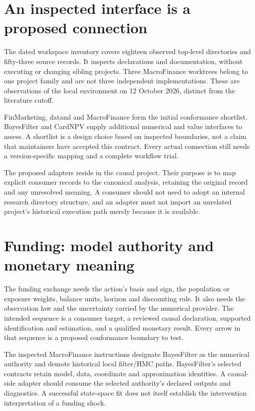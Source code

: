 \section{An inspected interface is a proposed connection}

The dated workspace inventory covers eighteen observed top-level directories
and fifty-three source records. It inspects declarations and documentation,
without executing or changing sibling projects. Three MacroFinance worktrees
belong to one project family and are not three independent implementations.
These are observations of the local environment on 12 October 2026, distinct
from the literature cutoff.\cite{v12_in_inventory}

FinMarketing, dataml and MacroFinance form the initial conformance shortlist.
BayesFilter and CardNPV supply additional numerical and value interfaces to
assess. A shortlist is a design choice based on inspected boundaries, not a
claim that maintainers have accepted this contract. Every actual connection
still needs a version-specific mapping and a complete workflow trial.

The proposed adapters reside in the causal project. Their purpose is to map
explicit consumer records to the canonical analysis, retaining the original
record and any unresolved meaning. A consumer should not need to adopt an
internal research directory structure, and an adapter must not import an
unrelated project's historical execution path merely because it is available.

\section{Funding: model authority and monetary meaning}

The funding exchange needs the action's basis and sign, the population or
exposure weights, balance units, horizon and discounting rule. It also needs
the observation law and the uncertainty carried by the numerical provider.
The intended sequence is a consumer target, a reviewed causal declaration,
supported identification and estimation, and a qualified monetary result.
Every arrow in that sequence is a proposed conformance boundary to test.

The inspected MacroFinance instructions designate BayesFilter as the numerical
authority and demote historical local filter/HMC paths. BayesFilter's selected
contracts retain model, data, coordinate and approximation identities.
\cite{v12_in_inventory} A causal-side adapter should consume the selected
authority's declared outputs and diagnostics. A successful state-space fit
does not itself establish the intervention interpretation of a funding shock.

